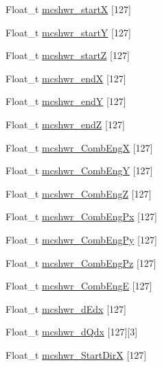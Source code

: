 \begin{DoxyCompactItemize}
\item 
Float\-\_\-t \hyperlink{classanatree_ac0f1731ca25b36d5612815be3e73dc5a}{mcshwr\-\_\-start\-X} \mbox{[}127\mbox{]}
\item 
Float\-\_\-t \hyperlink{classanatree_abd3a8a23f113b38579b89e509ed413bc}{mcshwr\-\_\-start\-Y} \mbox{[}127\mbox{]}
\item 
Float\-\_\-t \hyperlink{classanatree_a0d6ecbb9b05299434d4fbe4f3b85eaa9}{mcshwr\-\_\-start\-Z} \mbox{[}127\mbox{]}
\item 
Float\-\_\-t \hyperlink{classanatree_ab02155b58d62786d6e99004e1119eba1}{mcshwr\-\_\-end\-X} \mbox{[}127\mbox{]}
\item 
Float\-\_\-t \hyperlink{classanatree_aeb1e432541b1313cb14a1cd5041dbc19}{mcshwr\-\_\-end\-Y} \mbox{[}127\mbox{]}
\item 
Float\-\_\-t \hyperlink{classanatree_a599529a533d5013a50554f892831bf33}{mcshwr\-\_\-end\-Z} \mbox{[}127\mbox{]}
\item 
Float\-\_\-t \hyperlink{classanatree_a17b88c8f2c0408f6011ee0de6d28578c}{mcshwr\-\_\-\-Comb\-Eng\-X} \mbox{[}127\mbox{]}
\item 
Float\-\_\-t \hyperlink{classanatree_a1fbd480ec788b20bfff9b880784d9383}{mcshwr\-\_\-\-Comb\-Eng\-Y} \mbox{[}127\mbox{]}
\item 
Float\-\_\-t \hyperlink{classanatree_acc7081679367e68ebd65eca698986f0b}{mcshwr\-\_\-\-Comb\-Eng\-Z} \mbox{[}127\mbox{]}
\item 
Float\-\_\-t \hyperlink{classanatree_a8bb6c8a294750898bfb9546e47c63742}{mcshwr\-\_\-\-Comb\-Eng\-Px} \mbox{[}127\mbox{]}
\item 
Float\-\_\-t \hyperlink{classanatree_ab178dd2598bcf04cb3eb205b943d07a4}{mcshwr\-\_\-\-Comb\-Eng\-Py} \mbox{[}127\mbox{]}
\item 
Float\-\_\-t \hyperlink{classanatree_ad7932d4949a2a0f4029ae4c5ecaab12d}{mcshwr\-\_\-\-Comb\-Eng\-Pz} \mbox{[}127\mbox{]}
\item 
Float\-\_\-t \hyperlink{classanatree_aeedca73609c3c27d1230879f3ceefc39}{mcshwr\-\_\-\-Comb\-Eng\-E} \mbox{[}127\mbox{]}
\item 
Float\-\_\-t \hyperlink{classanatree_a821cdd3964a9a9daf3a3a6cb7dc2efc0}{mcshwr\-\_\-d\-Edx} \mbox{[}127\mbox{]}
\item 
Float\-\_\-t \hyperlink{classanatree_a5f39ddc8fb2654dee3015855b55b9aa8}{mcshwr\-\_\-d\-Qdx} \mbox{[}127\mbox{]}\mbox{[}3\mbox{]}
\item 
Float\-\_\-t \hyperlink{classanatree_a9c9a34e1455c1ec56e128bf598dea736}{mcshwr\-\_\-\-Start\-Dir\-X} \mbox{[}127\mbox{]}

\end{DoxyCompactItemize}
